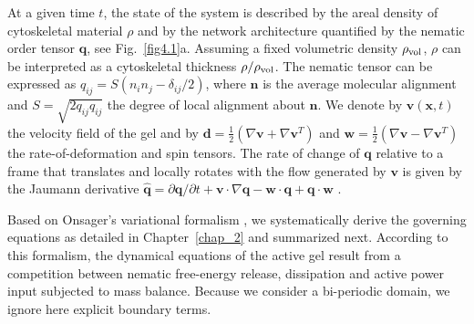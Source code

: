 	 At a given time $t$, the state of the system is described by the areal density of cytoskeletal material $\rho$ and by the network architecture quantified by the nematic order tensor $\bm{q}$, see Fig.~\ref{fig4.1}a. Assuming a fixed volumetric density $\rho_{\rm vol}$, $\rho$ can be interpreted as a cytoskeletal thickness $\rho/\rho_{\rm vol}$. The nematic tensor can be expressed as  $q_{ij} =S\left({n}_i n_j - \delta_{ij}/2 \right)$, where $\bm{n}$ is the average molecular alignment and $S=\sqrt{2   q_{ij}q_{ij}}$ the degree of local alignment about $\bm{n}$. We denote by $\bm{v}( \bm{x},t )$ the velocity field of the gel and by $\bm{d} = \frac{1}{2}(\nabla \bm{v}+ \nabla \bm{v}^T)$ and $\bm{w} = \frac{1}{2}(\nabla \bm{v}- \nabla \bm{v}^T)$ the rate-of-deformation and spin tensors. The rate of change of $\bm{q}$ relative to a frame that translates and locally rotates with the flow generated by $\bm{v}$ is given by the Jaumann derivative $\hat{\bm{q}} = \partial \bm{q} /\partial t + \bm{v} \cdot \nabla \bm{q}- \bm{w} \cdot \bm{q} +  \bm{q} \cdot \bm{w}$ \cite{de1993}.

Based on Onsager's variational formalism \cite{doi2011,arroyo2018}, we systematically derive the governing equations as detailed in Chapter~\ref{chap_2} and summarized next. According to this formalism, the dynamical equations of the active gel result from a competition between nematic free-energy release, dissipation and active power input subjected to mass balance. Because we consider a bi-periodic domain, we ignore here explicit boundary terms. 

